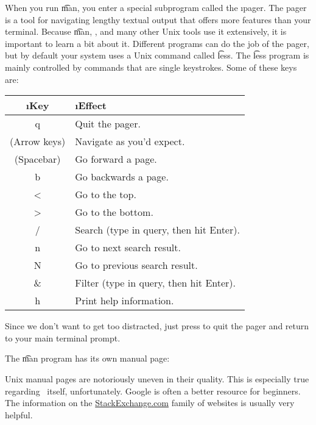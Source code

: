 \documentclass[letterpaper,12pt,titlepage,twoside]{article}
\begin{document}
When you run \t{man}, you enter a special subprogram called the \i{pager}. The
pager is a tool for navigating lengthy textual output that offers more
features than your terminal. Because \t{man}, \git, and many other Unix tools
use it extensively, it is important to learn a bit about it. Different
programs can do the job of the pager, but by default your system uses a Unix
command called \t{less}. The \t{less} program is mainly controlled by commands
that are single keystrokes. Some of these keys are:

\begin{center}
\label{l.lesskeys}
\begin{tabular}{>{\ttfamily}cl}
\rmfamily\i{Key} & \i{Effect} \\ \hline
q & Quit the pager. \\
\rmfamily(Arrow keys) & Navigate as you'd expect. \\
\rmfamily(Spacebar) & Go forward a page. \\
b & Go backwards a page. \\
< & Go to the top. \\
> & Go to the bottom. \\
/ & Search (type in query, then hit Enter). \\
n & Go to next search result. \\
N & Go to previous search result. \\
\& & Filter (type in query, then hit Enter). \\
h & Print help information.
\end{tabular}
\end{center}

Since we don't want to get too distracted, just press  to quit the
pager and return to your main terminal prompt.


The \t{man} program has its own manual page:


Unix manual pages are notoriously uneven in their quality. This is especially
true regarding \git\ itself, unfortunately. Google is often a better resource
for beginners. The information on the
\href{http://stackexchange.com/}{StackExchange.com} family of websites is
usually very helpful.
\end{document}
